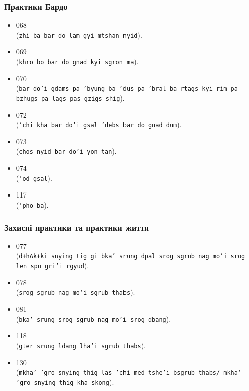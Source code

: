\documentclass{article}
\begin{document}
\subsubsection{Практики Бардо}

\begingroup\raggedright
\begin{itemize}
\item 068  \\ (\texttt{zhi ba bar do lam gyi mtshan nyid}).
\item 069  \\ (\texttt{khro bo bar do gnad kyi sgron ma}).
\item 070  \\ (\texttt{bar do'i gdams pa 'byung ba 'dus pa 'bral ba rtags kyi rim pa bzhugs pa lags pas gzigs shig}).
\item 072  \\ (\texttt{'chi kha bar do'i gsal 'debs bar do gnad dum}).
\item 073  \\ (\texttt{chos nyid bar do'i yon tan}).
\item 074  \\ (\texttt{'od gsal}).
\item 117  \\ (\texttt{'pho ba}).
\end{itemize}
\endgroup

\subsubsection{Захисні практики та практики життя}

\begingroup\raggedright
\begin{itemize}
\item 077  \\ (\texttt{d+hAk+ki snying tig gi bka' srung dpal srog sgrub nag mo'i srog len spu gri'i rgyud}).
\item 078  \\ (\texttt{srog sgrub nag mo'i sgrub thabs}).
\item 081  \\ (\texttt{bka' srung srog sgrub nag mo'i srog dbang}).
\item 118  \\ (\texttt{gter srung ldang lha'i sgrub thabs}).
\item 130  \\ (\texttt{mkha' 'gro snying thig las 'chi med tshe'i bsgrub thabs/ mkha' 'gro snying thig kha skong}).
\end{itemize}
\endgroup
\end{document}
